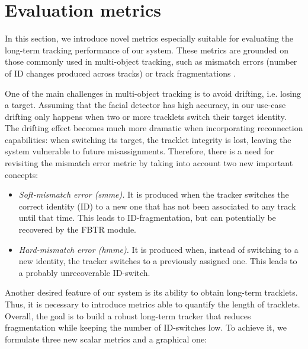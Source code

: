 \section{Evaluation metrics}


In this section, we introduce novel metrics especially suitable for evaluating the long-term tracking performance of our system. These metrics are grounded on those commonly used in multi-object tracking, such as mismatch errors (number of ID changes produced across tracks) or track fragmentations \cite{milan2016mot16}.

One of the main challenges in multi-object tracking is to avoid drifting, i.e. losing a target. Assuming that the facial detector has high accuracy, in our use-case drifting only happens when two or more tracklets switch their target identity. The drifting effect becomes much more dramatic when incorporating reconnection capabilities: when switching its target, the tracklet integrity is lost, leaving the system vulnerable to future misassignments. Therefore, there is a need for revisiting the mismatch error metric by taking into account two new important concepts:

\begin{itemize}
    \item \textit{Soft-mismatch error (smme).} It is produced when the tracker switches the correct identity (ID) to a new one that has not been associated to any track until that time. This leads to ID-fragmentation, but can potentially be recovered by the FBTR module.
    \item \textit{Hard-mismatch error (hmme).} It is produced when, instead of switching to a new identity, the tracker switches to a previously assigned one. This leads to a probably unrecoverable ID-switch.
\end{itemize}

Another desired feature of our system is its ability to obtain long-term tracklets. Thus, it is necessary to introduce metrics able to quantify the length of tracklets. Overall, the goal is to build a robust long-term tracker that reduces fragmentation while keeping the number of ID-switches low. To achieve it, we formulate three new scalar metrics and a graphical one: \\

